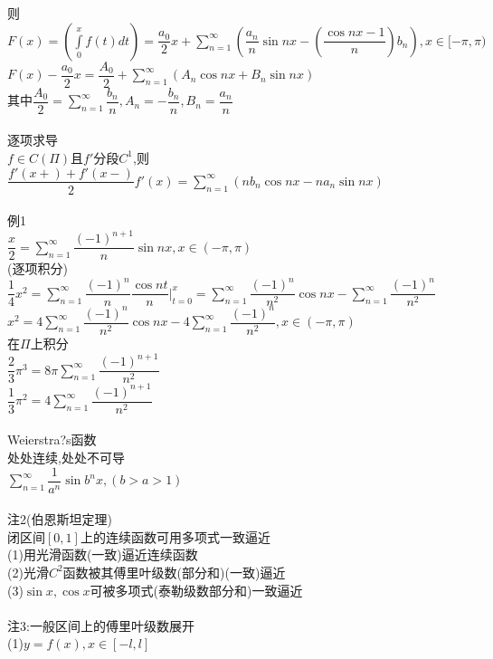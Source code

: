 \documentclass[11pt, a4paper, UTF8]{ctexart}
\begin{document}
则$ F(x)=(\int\limits_{0}^{x}f(t)dt)=\dfrac{a_0}{2}x+\sum\limits_{n=1}^{\infty}(\dfrac{a_n}{n}\sin nx-(\dfrac{\cos nx-1}{n})b_n),x\in[-\pi,\pi) $\\
$ F(x)-\dfrac{a_0}{2}x=\dfrac{A_0}{2}+\sum\limits_{n=1}^{\infty}(A_n\cos nx+B_n\sin nx) $\\
其中$ \dfrac{A_0}{2}=\sum\limits_{n=1}^{\infty}\dfrac{b_n}{n},A_n=-\dfrac{b_n}{n},B_n=\dfrac{a_n}{n} $\\
\\
逐项求导\\
$f\in C(\Pi)$且$f'$分段$C^1$,则\\
$\dfrac{f'(x+)+f'(x-)}{2}f'(x)=\sum\limits_{n=1}^{\infty}(nb_n\cos nx-na_n\sin nx)$\\
\\
例1\\
$\dfrac{x}{2}=\sum\limits_{n=1}^{\infty}\dfrac{(-1)^{n+1}}{n}\sin nx,x\in(-\pi,\pi)$\\
(逐项积分)\\
$\dfrac{1}{4}x^2=\sum\limits_{n=1}^{\infty}\dfrac{(-1)^{n}}{n}\dfrac{\cos nt}{n}|_{t=0}^{x}=\sum\limits_{n=1}^{\infty}\dfrac{(-1)^n}{n^2}\cos nx-\sum\limits_{n=1}^{\infty}\dfrac{(-1)^n}{n^2}$\\
$x^2=4\sum\limits_{n=1}^{\infty}\dfrac{(-1)^n}{n^2}\cos nx-4\sum\limits_{n=1}^{\infty}\dfrac{(-1)^n}{n^2},x\in(-\pi,\pi)$\\
在$\Pi$上积分\\
$\dfrac{2}{3}\pi^3=8\pi\sum\limits_{n=1}^{\infty}\dfrac{(-1)^{n+1}}{n^2}$\\
$\dfrac{1}{3}\pi^2=4\sum\limits_{n=1}^{\infty}\dfrac{(-1)^{n+1}}{n^2}$\\
\\
Weierstra?s函数\\
处处连续,处处不可导\\
$\sum\limits_{n=1}^{\infty}\dfrac{1}{a^n}\sin b^nx,(b>a>1)$\\
\\
注2(伯恩斯坦定理)\\
闭区间$[0,1]$上的连续函数可用多项式一致逼近\\
(1)用光滑函数(一致)逼近连续函数\\
(2)光滑$C^2$函数被其傅里叶级数(部分和)(一致)逼近\\
(3)$\sin x,\cos x$可被多项式(泰勒级数部分和)一致逼近\\
\\
注3:一般区间上的傅里叶级数展开\\
(1)$y=f(x),x\in[-l,l]$\\
\end{document}
